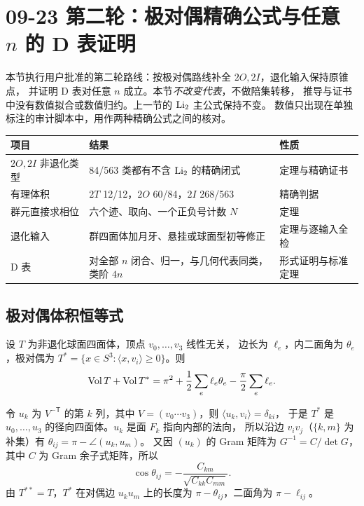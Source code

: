 \section[09-23 第二轮：极对偶精确公式与全部阶的 D 表证明]{09-23 第二轮：极对偶精确公式与任意 $n$ 的 D 表证明}
\label{sec:polar-dual}

本节执行用户批准的第二轮路线：按极对偶路线补全 $2O,2I$，退化输入保持原锥点，
并证明 D 表对任意 $n$ 成立。本节\emph{不改变代表}，不做陪集转移，
推导与证书中没有数值拟合或数值归约。上一节的 $\operatorname{Li}_2$ 主公式保持不变。
数值只出现在单独标注的审计脚本中，用作两种精确公式之间的核对。

\begin{center}\small
\begin{tabular}{@{}lll@{}}\toprule
项目 & 结果 & 性质\\\midrule
$2O,2I$ 非退化类型 & 84/563 类都有不含 $\operatorname{Li}_2$ 的精确闭式 & 定理与精确证书\\
有理体积 & $2T$ 12/12，$2O$ 60/84，$2I$ 268/563 & 精确判据\\
群元直接求相位 & 六个迹、取向、一个正负号计数 $N$ & 定理\\
退化输入 & 群四面体加月牙、悬挂或球面型初等修正 & 定理与逐输入全检\\
D 表 & 对全部 $n$ 闭合、归一，与几何代表同类，类阶 $4n$ & 形式证明与标准定理\\
\bottomrule\end{tabular}\end{center}

\subsection{极对偶体积恒等式}

\begin{theorem}\label{thm:polar-identity}
设 $T$ 为非退化球面四面体，顶点 $v_0,\ldots,v_3$ 线性无关，
边长为 $\ell_e$，内二面角为 $\theta_e$，极对偶为
$T^*=\{x\in S^3:\langle x,v_i\rangle\ge0\}$。则
\[
\operatorname{Vol} T+\operatorname{Vol} T^*=\pi^2+\frac12\sum_e\ell_e\theta_e-\frac\pi2\sum_e\ell_e .
\]
\end{theorem}

\begin{lemma}\label{lem:polar-edges}
令 $u_k$ 为 $V^{-\mathsf T}$ 的第 $k$ 列，其中 $V=(v_0\cdots v_3)$，则 $\langle u_k,v_i\rangle=\delta_{ki}$，
于是 $T^*$ 是 $u_0,\ldots,u_3$ 的径向四面体。$u_k$ 是面 $F_k$ 指向内部的法向，
所以沿边 $v_iv_j$（$\{k,m\}$ 为补集）有 $\theta_{ij}=\pi-\angle(u_k,u_m)$。
又因 $(u_k)$ 的 Gram 矩阵为 $G^{-1}=C/\det G$，其中 $C$ 为 Gram 余子式矩阵，所以
\[
\cos\theta_{ij}=-\frac{C_{km}}{\sqrt{C_{kk}C_{mm}}}.
\]
由 $T^{**}=T$，$T^*$ 在对偶边 $u_ku_m$ 上的长度为 $\pi-\theta_{ij}$，二面角为 $\pi-\ell_{ij}$。
\end{lemma}

